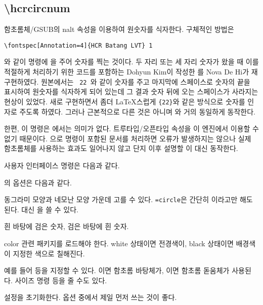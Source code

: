
\subsection{\textbackslash hcrcircnum}
함초롬체/GSUB의 nalt 속성을 이용하여 원숫자를 식자한다.
구체적인 방법은 
\begin{verbatim}
\fontspec[Annotation=4]{HCR Batang LVT} 1
\end{verbatim}
와 같이  명령에 을 주어 숫자를 찍는 것이다. 두 자리 또는 세 자리 숫자가 왔을 때 이를 적절하게 처리하기 위한 코드를 포함하는 Dohyun Kim이 작성한 를 Nova De Hi가 재구현하였다.
원본에서는 \texttt{ 22 }와 같이 숫자를 주고 마지막에 스페이스로 숫자의 끝을 표시하여 원숫자를 식자하게 되어 있는데 그 결과 숫자 뒤에 오는 스페이스가
사라지는 현상이 있었다. 새로 구현하면서 좀더 \LaTeX 스럽게 \texttt{\{22\}}와 같은 방식으로 숫자를
인자로 주도록 하였다. 그러나 근본적으로 다른 것은 아니며 와 거의 동일하게 동작한다.

한편, 이 명령은 \pdftex 에서는 의미가 없다. 트루타입/오픈타입 속성을 이 엔진에서 이용할 수 없기
때문이다.
\pdftex 으로  명령이 포함된 문서를
처리하면 오류가 발생하지는 않으나 실제 함초롬체를 사용하는 효과도 일어나지 않고 단지 이후 설명할 이 대신 동작한다.

사용자 인터페이스 명령은 다음과 같다.

\begin{boxedverbatim}
\end{boxedverbatim}

의 옵션은 다음과 같다.
\begin{description}\firmlist
\item [\ct{shape}] 동그라미 모양과 네모난 모양 가운데 고를 수 있다. \texttt{=circle}은 간단히 이라고만 해도 된다.  대신 을 쓸 수 있다.
\item [\ct{white}, \ct{black}] 흰 바탕에 검은 숫자, 검은 바탕에 흰 숫자.
\item [\ct{color}] color 관련 패키지를 로드해야 한다. white 상태이면 전경색이, black 상태이면 배경색이 지정한 색으로 칠해진다.
\item [\ct{font}] 예를 들어  등을 지정할 수 있다. 이면 함초롬 바탕체가, 이면 함초롬 돋움체가 사용된다. 사이즈 명령 등을 줄 수도 있다.
\item [\ct{reset}] 설정을 초기화한다. 옵션 중에서 제일 먼저 쓰는 것이 좋다.
\end{description}

